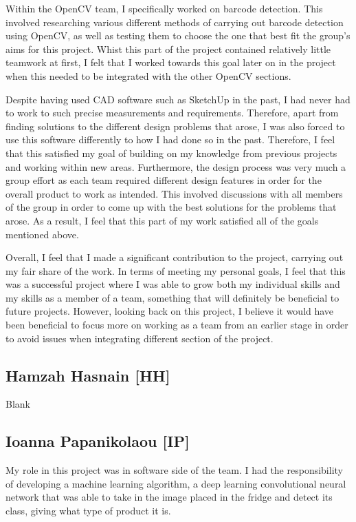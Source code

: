 Within the OpenCV team, I specifically worked on barcode detection.
This involved researching various different methods of carrying out barcode detection using OpenCV, as well as testing them to choose the one that best fit the group's aims for this project.
Whist this part of the project contained relatively little teamwork at first, I felt that I worked towards this goal later on in the project when this needed to be integrated with the other OpenCV sections.

Despite having used CAD software such as SketchUp in the past, I had never had to work to such precise measurements and requirements.
Therefore, apart from finding solutions to the different design problems that arose, I was also forced to use this software differently to how I had done so in the past.
Therefore, I feel that this satisfied my goal of building on my knowledge from previous projects and working within new areas.
Furthermore, the design process was very much a group effort as each team required different design features in order for the overall product to work as intended.
This involved discussions with all members of the group in order to come up with the best solutions for the problems that arose.
As a result, I feel that this part of my work satisfied all of the goals mentioned above.

Overall, I feel that I made a significant contribution to the project, carrying out my fair share of the work.
In terms of meeting my personal goals, I feel that this was a successful project where I was able to grow both my individual skills and my skills as a member of a team, something that will definitely be beneficial to future projects.
However, looking back on this project, I believe it would have been beneficial to focus more on working as a team from an earlier stage in order to avoid issues when integrating different section of the project.


\subsection{Hamzah Hasnain [HH]}

Blank


\subsection{Ioanna Papanikolaou [IP]}
My role in this project was in software side of the team.
I had the responsibility of developing a machine learning algorithm, a deep learning convolutional neural network that was able to take in the image placed in the fridge and detect its class, giving what type of product it is.

